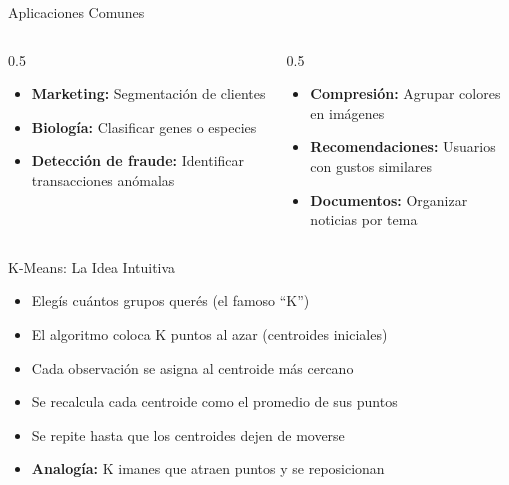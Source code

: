 \documentclass{beamer}
\begin{document}
\begin{frame}{Aplicaciones Comunes}
    \begin{columns}
        \begin{column}{0.5\textwidth}
            \begin{itemize}
                \item \textbf{Marketing:} Segmentación de clientes
                \item \textbf{Biología:} Clasificar genes o especies
                \item \textbf{Detección de fraude:} Identificar transacciones anómalas
            \end{itemize}
        \end{column}
        \begin{column}{0.5\textwidth}
            \begin{itemize}
                \item \textbf{Compresión:} Agrupar colores en imágenes
                \item \textbf{Recomendaciones:} Usuarios con gustos similares
                \item \textbf{Documentos:} Organizar noticias por tema
            \end{itemize}
        \end{column}
    \end{columns}
\end{frame}

\begin{frame}{K-Means: La Idea Intuitiva}
    \begin{itemize}
        \item<1-> Elegís cuántos grupos querés (el famoso ``K'')
        \item<2-> El algoritmo coloca K puntos al azar (centroides iniciales)
        \item<3-> Cada observación se asigna al centroide más cercano
        \item<4-> Se recalcula cada centroide como el promedio de sus puntos
        \item<5-> Se repite hasta que los centroides dejen de moverse
        \item<6-> \textbf{Analogía:} K imanes que atraen puntos y se reposicionan
    \end{itemize}
\end{frame}
\end{document}
